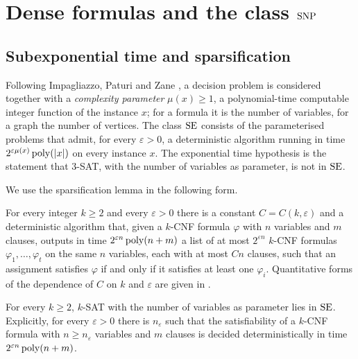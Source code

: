 \section{Dense formulas and the class \texorpdfstring{$\operatorname{SNP}$}{SNP}}\label{sec:snp}

\subsection{Subexponential time and sparsification}
Following Impagliazzo, Paturi and Zane \cite{IPZ01}, a decision problem is
considered together with a \emph{complexity parameter} $\mu(x)\ge1$, a
polynomial-time computable integer function of the instance $x$; for a
formula it is the number of variables, for a graph the number of vertices. The
class $\SE$ consists of the parameterised problems that admit, for every
$\varepsilon>0$, a deterministic algorithm running in time
$2^{\varepsilon\mu(x)}\operatorname{poly}(|x|)$ on every instance $x$. The exponential time
hypothesis is the statement that $3$-SAT, with the number of variables as
parameter, is not in $\SE$.

We use the sparsification lemma in the following form.

\begin{theorem}\label{thm:sparsification}
For every integer $k\ge2$ and every $\varepsilon>0$ there is a constant
$C=C(k,\varepsilon)$ and a deterministic algorithm that, given a $k$-CNF formula
$\varphi$ with $n$ variables and $m$ clauses, outputs in time
$2^{\varepsilon n}\operatorname{poly}(n+m)$ a list of at most $2^{\varepsilon n}$ $k$-CNF
formulas $\varphi_1,\dots,\varphi_t$ on the same $n$ variables, each with at most
$Cn$ clauses, such that an assignment satisfies $\varphi$ if and only if it
satisfies at least one $\varphi_i$. Quantitative forms of the dependence of $C$
on $k$ and $\varepsilon$ are given in \cite{CIP06}.
\end{theorem}

\begin{theorem}[$k$-SAT is in $\SE$]\label{thm:ksatse}
For every $k\ge2$, $k$-SAT with the number of variables as parameter lies in
$\SE$. Explicitly, for every $\varepsilon>0$ there is $n_\varepsilon$ such that
the satisfiability of a $k$-CNF formula with $n\ge n_\varepsilon$ variables and
$m$ clauses is decided deterministically in time $2^{\varepsilon n}\operatorname{poly}(n+m)$.
\end{theorem}

